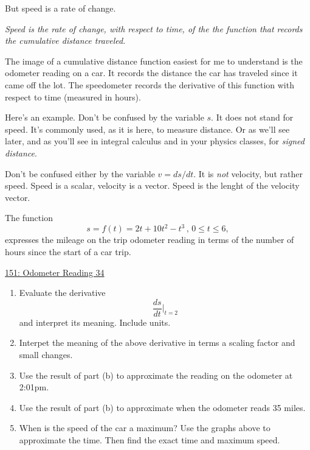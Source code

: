 \documentclass{ximera}
\begin{document}
But speed is a rate of change. 

\emph{Speed is the rate of change, with respect to time, of the the function that records the cumulative distance traveled.}

The image of a cumulative distance function easiest for me to understand is the odometer reading on a car. It records the distance the car has traveled since it came off the lot. The speedometer records the derivative of this function with respect to time (measured in hours). %

Here's an example. Don't be confused by the variable $s$. It does not stand for speed. It's commonly used, as it is here, to measure distance. Or as we'll see later, and as you'll see in integral calculus and in your physics classes,  for \emph{signed distance}.

Don't be confused either by the variable $v=ds/dt$. It is \emph{not} velocity, but rather speed. Speed is a scalar, velocity is a vector. Speed is the lenght of the velocity vector.

\begin{example}  \label{ExLKDremdmm}
The function
\[
    s = f(t) = 2t+10t^{2}-t^{3} \, , \, 0\leq t\leq 6 ,
\]
expresses the mileage on the trip odometer reading in terms of the number of hours since the start of a car trip.

\begin{onlineOnly}
    \begin{center}
\end{center}
\end{onlineOnly}

\href{https://www.desmos.com/calculator/t1ruocrgm4}{151: Odometer Reading 34}

\begin{enumerate}
\item Evaluate the derivative
\[
    \frac{ds}{dt}\Big|_{t=2}
\]
and interpret its meaning. Include units.

\item Interpet the meaning of the above derivative in terms a scaling factor and small changes.

\item Use the result of part (b) to approximate the reading on the odometer at 2:01pm.

\item Use the result of part (b) to approximate when the odometer reads 35 miles.

\item When is the speed of the car a maximum? Use the graphs above to approximate the time. Then find the exact time and  maximum speed.
\end{enumerate}

\end{example}
\end{document}
